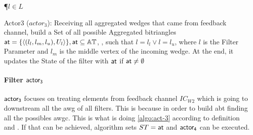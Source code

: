 \begin{algorithm}[h!]
\DontPrintSemicolon
{}
\SetAlgoRefName{[A7]}
\P{$l \in L$}
\FS{$\dwi \subseteq \dw$}
\BlankLine
{}
\PC{$|\ati| \geq 1 \lor \fid$}
\caption[Actor3 ($actor_3$)]{Actor3 ($actor_3$): Receiving all aggregated wedges that came from feedback channel, build a Set of all possible Aggregated bitriangles $\mathsf{at} = \{\left\langle (l_l, l_m, l_u), U_l \right\rangle\}, \mathsf{at} \subseteq \mathbb{AT}$, , such that $l = l_l \lor l = l_u$, where $l$ is the Filter Parameter and $l_m$ is the middle vertex of the incoming wedge. At the end, it updates the State of the filter with $\mathsf{at}$ if $\mathsf{at} \neq \emptyset$}
\label{algo:act-3}
\end{algorithm}

\paragraph{Filter $\mathsf{actor_3}$} $\mathsf{actor_3}$ focuses on treating elements from feedback channel $IC_{W2}$ which is going to downstream all the \acrshort{awg} of all filters.
This is because in order to build \acrshort{abt} finding all the possibles \acrshort{awgc}. This is what is doing \autoref{algo:act-3} according to definition 
 and . If that can be achieved, algorithm sets $ST = \mathsf{at}$ and $\mathsf{actor_4}$ can be executed.

